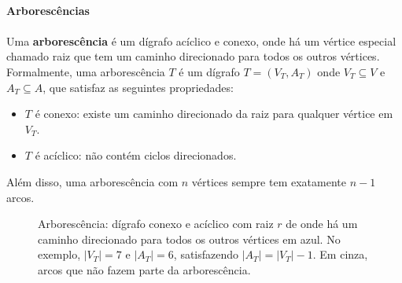 \documentclass[12pt,a4paper]{article}
\def\\{}%
\def\emph#1{#1}%
\begin{document}
\paragraph{Arborescências}

\paragraph{}Uma \textbf{arborescência} é um dígrafo acíclico e conexo, onde há um vértice especial chamado \emph{raiz} que tem um caminho direcionado para todos os outros vértices. Formalmente, uma arborescência \(T\) é um dígrafo \(T = (V_T, A_T)\) onde \(V_T \subseteq V\) e \(A_T \subseteq A\), que satisfaz as seguintes propriedades:
\begin{itemize}
    \item \(T\) é conexo: existe um caminho direcionado da raiz para qualquer vértice em \(V_T\).
    \item \(T\) é acíclico: não contém ciclos direcionados.
\end{itemize}
Além disso, uma arborescência com \(n\) vértices sempre tem exatamente \(n-1\) arcos.
\begin{figure}[H]
\centering
{}
\caption{Arborescência: dígrafo conexo e acíclico com raiz $r$ de onde há um caminho direcionado para todos os outros vértices em azul. No exemplo, $|V_T|=7$ e $|A_T|=6$, satisfazendo $|A_T|=|V_T|-1$. Em cinza, arcos que não fazem parte da arborescência.}
\label{fig:arborescencia}
\end{figure}
\end{document}
